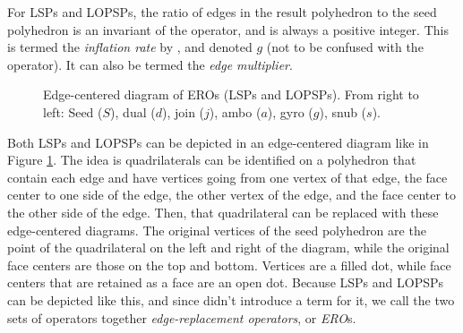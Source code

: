 \documentclass{amsart}[12pt]
\begin{document}
For LSPs and LOPSPs, the ratio of edges in the result polyhedron to the seed
polyhedron is an invariant of the operator, and is always a positive integer.
This is termed the \textit{inflation rate} by \cite{brinkmann},
and denoted $g$ (not to be confused with the operator).
It can also be termed the \textit{edge multiplier}.

\begin{figure}

\caption{Edge-centered diagram of EROs (LSPs and LOPSPs). From right to left:
Seed ($S$), dual ($d$), join ($j$), ambo ($a$), gyro ($g$), snub ($s$).}
\label{fig:edgecentered}
\end{figure}

Both LSPs and LOPSPs can be depicted in an edge-centered diagram like in Figure
\ref{fig:edgecentered}. The idea is quadrilaterals can be identified on a
polyhedron that contain each edge and have vertices going from one vertex of
that edge, the face center to one side of the edge, the other vertex of the
edge, and the face center to the other side of the edge. Then, that
quadrilateral can be replaced with these edge-centered diagrams. The original
vertices of the seed polyhedron are the point of the quadrilateral on the left
and right of the diagram, while the original face centers are those on the top
and bottom. Vertices are a filled dot, while face centers that are retained as
a face are an open dot. Because LSPs and LOPSPs can be depicted like this, and
since \cite{brinkmann} didn't introduce a term for it, we call the two sets of
operators together \textit{edge-replacement operators}, or \textit{ERO}s.
\end{document}
